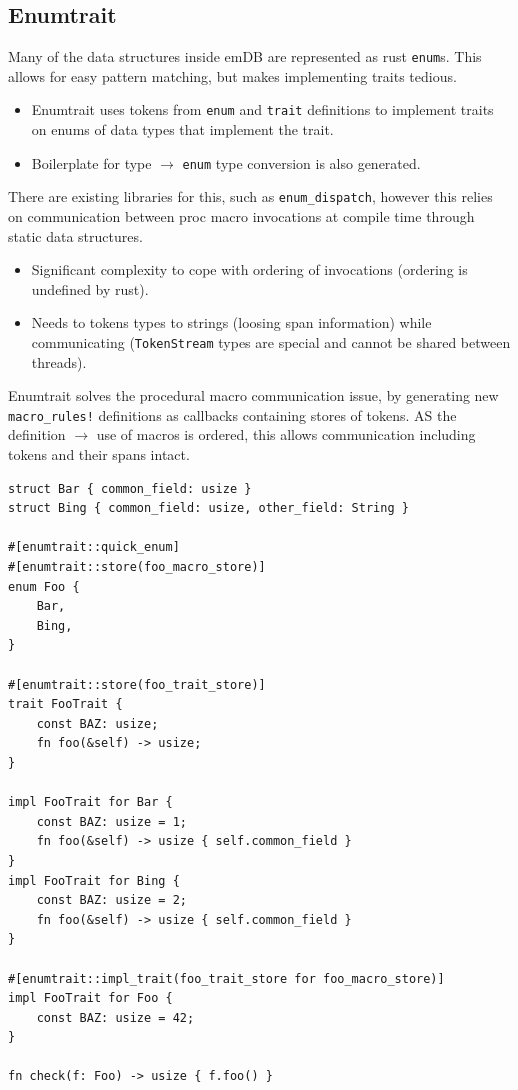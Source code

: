 \subsection{Enumtrait}
Many of the data structures inside emDB are represented as rust \texttt{enum}s.
This allows for easy pattern matching, but makes implementing traits tedious.
\begin{itemize}
    \setlength\itemsep{0em}
    \item Enumtrait uses tokens from \texttt{enum} and \texttt{trait} definitions to implement traits on enums of data types that implement the trait.
    \item Boilerplate for type $\to$ \texttt{enum} type conversion is also generated.
\end{itemize}
There are existing libraries for this, such as \texttt{enum_dispatch}, however this relies on
communication between proc macro invocations at compile time through static data structures.
\begin{itemize}
    \setlength\itemsep{0em}
    \item Significant complexity to cope with ordering of invocations (ordering is undefined by rust).
    \item Needs to tokens types to strings (loosing span information) while communicating (\texttt{TokenStream} types are special and cannot be shared between threads).
\end{itemize}


Enumtrait solves the procedural macro communication issue, by generating new \texttt{macro_rules!} definitions
as callbacks containing stores of tokens. AS the definition $\to$ use of macros is ordered, this allows communication including tokens and their spans intact.

\begin{verbatim}
struct Bar { common_field: usize }
struct Bing { common_field: usize, other_field: String }

#[enumtrait::quick_enum]
#[enumtrait::store(foo_macro_store)]
enum Foo {
    Bar,
    Bing,
}

#[enumtrait::store(foo_trait_store)]
trait FooTrait {
    const BAZ: usize;
    fn foo(&self) -> usize;
}

impl FooTrait for Bar {  
    const BAZ: usize = 1;
    fn foo(&self) -> usize { self.common_field }
}
impl FooTrait for Bing { 
    const BAZ: usize = 2; 
    fn foo(&self) -> usize { self.common_field }
}

#[enumtrait::impl_trait(foo_trait_store for foo_macro_store)]
impl FooTrait for Foo {
    const BAZ: usize = 42;
}

fn check(f: Foo) -> usize { f.foo() }
\end{verbatim}

